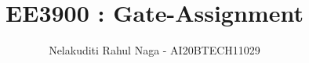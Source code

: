 \documentclass[journal,12pt,twocolumn]{IEEEtran}
\DeclareMathOperator*{\Res}{Res}
\begin{document}
\newcommand{\BEQA}{\begin{eqnarray}}
\newcommand{\EEQA}{\end{eqnarray}}
\newcommand{\define}{\stackrel{\triangle}{=}}

\raggedbottom
\setlength{\parindent}{0pt}
\providecommand{\mbf}{\mathbf}
\providecommand{\pr}[1]{\ensuremath{\Pr\left(#1\right)}}
\providecommand{\qfunc}[1]{\ensuremath{Q\left(#1\right)}}
\providecommand{\sbrak}[1]{\ensuremath{{}\left[#1\right]}}
\providecommand{\lsbrak}[1]{\ensuremath{{}\left[#1\right.}}
\providecommand{\rsbrak}[1]{\ensuremath{{}\left.#1\right]}}
\providecommand{\brak}[1]{\ensuremath{\left(#1\right)}}
\providecommand{\lbrak}[1]{\ensuremath{\left(#1\right.}}
\providecommand{\rbrak}[1]{\ensuremath{\left.#1\right)}}
\providecommand{\cbrak}[1]{\ensuremath{\left\{#1\right\}}}
\providecommand{\lcbrak}[1]{\ensuremath{\left\{#1\right.}}
\providecommand{\rcbrak}[1]{\ensuremath{\left.#1\right\}}}
\theoremstyle{remark}
\newtheorem{rem}{Remark}
\newcommand{\sgn}{\mathop{\mathrm{sgn}}}
\providecommand{\abs}[1]{\vert#1\vert}
\providecommand{\res}[1]{\Res\displaylimits_{#1}} 
\providecommand{\norm}[1]{\lVert#1\rVert}
\providecommand{\mtx}[1]{\mathbf{#1}}
\providecommand{\mean}[1]{E[ #1 ]}
\providecommand{\fourier}{\overset{\mathcal{F}}{ \rightleftharpoons}}
\providecommand{\system}{\overset{\mathcal{H}}{ \longleftrightarrow}}
\newcommand{\solution}{\noindent \textbf{Solution: }}
\newcommand{\cosec}{\,\text{cosec}\,}
\providecommand{\dec}[2]{\ensuremath{\overset{#1}{\underset{#2}{\gtrless}}}}
\newcommand{\myvec}[1]{\ensuremath{\begin{pmatrix}#1\end{pmatrix}}}
\newcommand{\mydet}[1]{\ensuremath{\begin{vmatrix}#1\end{vmatrix}}}
\makeatletter
{}
\makeatother
\let\StandardTheFigure\thefigure
\let\vec\mathbf
\renewcommand{\thefigure}{\theproblem}
\def\putbox#1#2#3{\makebox[0in][l]{\makebox[#1][l]{}\raisebox{\baselineskip}[0in][0in]{\raisebox{#2}[0in][0in]{#3}}}}
     \def\rightbox#1{\makebox[0in][r]{#1}}
     \def\centbox#1{\makebox[0in]{#1}}
     \def\topbox#1{\raisebox{-\baselineskip}[0in][0in]{#1}}
     \def\midbox#1{\raisebox{-0.5\baselineskip}[0in][0in]{#1}}
\vspace{3cm}
\title{ EE3900 : Gate-Assignment}
\author{Nelakuditi Rahul Naga - AI20BTECH11029}
\maketitle
\newpage
\bigskip
\renewcommand{\thefigure}{\theenumi}
\renewcommand{\thetable}{\theenumi}
\end{document}
